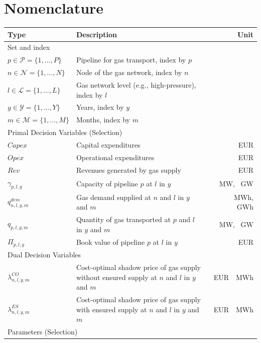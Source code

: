 \documentclass[review]{elsarticle}
\begin{document}
\section*{Nomenclature}
\begin{center}
	\renewcommand{\arraystretch}{1.0}
	\centering
	\small
	\begin{tabular}{lm{7.75cm}r}
		Type & Description & Unit\\
		\hline
		Set and index & & \\
		\hline
		{$p \in \mathcal{P}=\{1,\ldots,P\}$} & Pipeline for gas transport, index by $p$\\
		{$n \in \mathcal{N}=\{1,\ldots,N\}$} & Node of the gas network, index by $n$\\
		{$l \in \mathcal{L}=\{1,\ldots,L\}$} & Gas network level (e.g., high-pressure), index by $l$\\
		{$y \in \mathcal{Y}=\{1,\ldots,Y\}$} & Years, index by $y$\\
		{$m \in \mathcal{M}=\{1,\ldots,M\}$} & Months, index by $m$\\
		\hline
		\multicolumn{2}{l}{Primal Decision Variables (Selection)}\\
		\hline
		{$Capex$} & Capital expenditures & \SI{}{EUR}\\
		{$Opex$} & Operational expenditures & \SI{}{EUR}\\
		{$Rev$} & Revenues generated by gas supply & \SI{}{EUR}\\
		{$\gamma_{p,l,y}$} & Capacity of pipeline $p$ at $l$ in $y$& \SI{}{MW}, \SI{}{GW}\\
		{$q^{dem}_{n,l,y,m}$} & Gas demand supplied at $n$ and $l$ in $y$ and $m$ & \SI{}{MWh}, \SI{}{GWh}\\
		{$q_{p,l,y,m}$} & Quantity of gas transported at $p$ and $l$ in $y$ and $m$& \SI{}{MW}, \SI{}{GW}\\
		{$\Pi_{p,l,y}$} & Book value of pipeline $p$ at $l$ in $y$ & \SI{}{EUR}\\
		\hline
		\multicolumn{2}{l}{Dual Decision Variables}\\
		\hline
		{$\lambda^{CO}_{n,l,y,m}$} & Cost-optimal shadow price of gas supply without ensured supply at $n$ and $l$ in $y$ and $m$ & \SI{}{EUR \per MWh}\\
		{$\lambda^{ES}_{n,l,y,m}$} & Cost-optimal shadow price of gas supply with ensured supply at $n$ and $l$ in $y$ and $m$ & \SI{}{EUR \per MWh}\\
		\hline
		\multicolumn{2}{l}{Parameters (Selection)}\\

\end{tabular}
\end{center}
\end{document}
